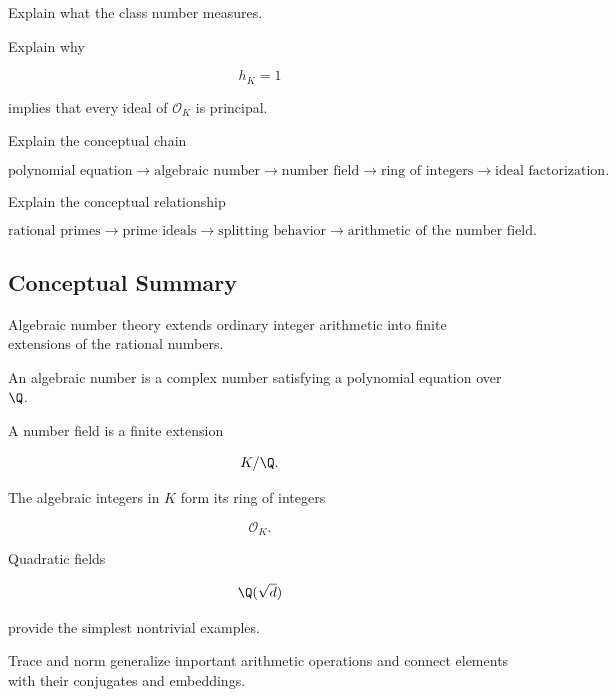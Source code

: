 \begin{exercise}[3]
Explain what the class number measures.
\end{exercise}

\begin{exercise}[3]
Explain why

\[ h_K=1 \]

implies that every ideal of \(\mathcal O_K\) is principal.
\end{exercise}

\begin{exercise}[3]
Explain the conceptual chain

\[
\text{polynomial equation}
\longrightarrow
\text{algebraic number}
\longrightarrow
\text{number field}
\longrightarrow
\text{ring of integers}
\longrightarrow
\text{ideal factorization}.
\]
\end{exercise}

\begin{exercise}[3]
Explain the conceptual relationship

\[
\text{rational primes}
\longrightarrow
\text{prime ideals}
\longrightarrow
\text{splitting behavior}
\longrightarrow
\text{arithmetic of the number field}.
\]
\end{exercise}

\subsection{Conceptual Summary}
\label{subsec:algebraic-number-theory-summary}

Algebraic number theory extends ordinary integer arithmetic into finite
extensions of the rational numbers.

An algebraic number is a complex number satisfying a polynomial equation over
\(\Q\).

A number field is a finite extension

\[ K/\Q. \]

The algebraic integers in \(K\) form its ring of integers

\[ \mathcal O_K. \]

Quadratic fields

\[ \Q(\sqrt d) \]

provide the simplest nontrivial examples.

Trace and norm generalize important arithmetic operations and connect
elements with their conjugates and embeddings.

